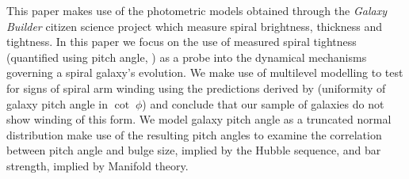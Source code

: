 This paper makes use of the photometric models obtained through the \textit{Galaxy Builder} citizen science project  which measure spiral brightness, thickness and tightness. In this paper we focus on the use of measured spiral tightness (quantified using pitch angle, \citealt{1987gady.book.....B}) as a probe into the dynamical mechanisms governing a spiral galaxy's evolution. We make use of multilevel modelling to test for signs of spiral arm winding using the predictions derived by \citealt{2019arXiv190910291P} (uniformity of galaxy pitch angle in $\cot\;\phi$) and conclude that our sample of galaxies do not show winding of this form. We model galaxy pitch angle as a truncated normal distribution make use of the resulting pitch angles to examine the correlation between pitch angle and bulge size, implied by the Hubble sequence, and bar strength, implied by Manifold theory.
